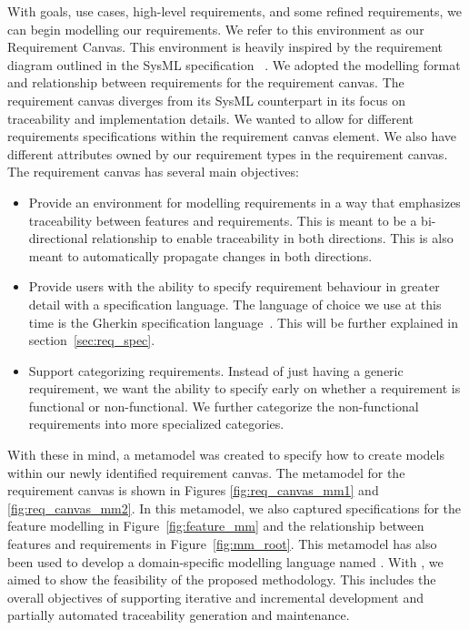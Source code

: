 With goals, use cases, high-level requirements, and some refined requirements, we can begin modelling our requirements. We refer to this environment as our Requirement Canvas. This environment is heavily inspired by the requirement diagram outlined in the SysML specification ~\cite{sysml2019omg}. We adopted the modelling format and relationship between requirements for the requirement canvas. The requirement canvas diverges from its SysML counterpart in its focus on traceability and implementation details. We wanted to allow for different requirements specifications within the requirement canvas element. We also have different attributes owned by our requirement types in the requirement canvas. The requirement canvas has several main objectives:
\begin{itemize}
	\item Provide an environment for modelling requirements in a way that emphasizes traceability between features and requirements. This is meant to be a bi-directional relationship to enable traceability in both directions. This is also meant to automatically propagate changes in both directions.
	\item Provide users with the ability to specify requirement behaviour in greater detail with a specification language. The language of choice we use at this time is the Gherkin specification language~\cite{cucumberdocs}. This will be further explained in section~\ref{sec:req_spec}.
	\item Support categorizing requirements. Instead of just having a generic requirement, we want the ability to specify early on whether a requirement is functional or non-functional. We further categorize the non-functional requirements into more specialized categories.
\end{itemize}  

With these in mind, a metamodel was created to specify how to create models within our newly identified requirement canvas. The metamodel for the requirement canvas is shown in Figures \ref{fig:req_canvas_mm1} and \ref{fig:req_canvas_mm2}. In this metamodel, we also captured specifications for the feature modelling in Figure~\ref{fig:feature_mm} and the relationship between features and requirements in Figure~\ref{fig:mm_root}. This metamodel has also been used to develop a domain-specific modelling language named \tool. With \tool, we aimed to show the feasibility of the proposed methodology. This includes the overall objectives of supporting iterative and incremental development and partially automated traceability generation and maintenance.

